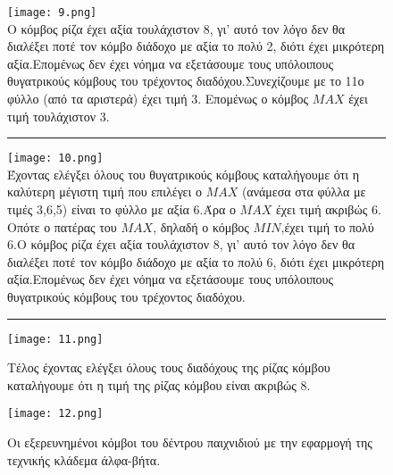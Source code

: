 \documentclass[10pt]{article}
\begin{document}
\begin{figure}[H]    \texttt{[image: 9.png]}\\
    \caption{Ο κόμβος ρίζα έχει αξία τουλάχιστον 8, γι' αυτό τον λόγο δεν θα διαλέξει ποτέ τον κόμβο διάδοχο με αξία το πολύ 2, διότι έχει μικρότερη αξία.Επομένως δεν έχει νόημα να εξετάσουμε τους υπόλοιπους θυγατρικούς κόμβους του τρέχοντος διαδόχου.Συνεχίζουμε με το 11ο φύλλο (από τα αριστερά) έχει τιμή 3. Επομένως ο κόμβος $MAX$ έχει τιμή τουλάχιστον 3.}

     \begin{center}
        \rule{120mm}{0.2mm}
    \end{center}
    \texttt{[image: 10.png]}\\
    \caption{Έχοντας ελέγξει όλους του θυγατρικούς κόμβους καταλήγουμε ότι η καλύτερη μέγιστη τιμή που επιλέγει ο $MAX$ (ανάμεσα στα φύλλα με τιμές 3,6,5) είναι το φύλλο με αξία 6.Άρα ο $MAX$ έχει τιμή ακριβώς 6. Οπότε ο πατέρας του $MAX$, δηλαδή ο κόμβος $MIN$,έχει τιμή το πολύ 6.Ο κόμβος ρίζα έχει αξία τουλάχιστον 8, γι' αυτό τον λόγο δεν θα διαλέξει ποτέ τον κόμβο διάδοχο με αξία το πολύ 6, διότι έχει μικρότερη αξία.Επομένως δεν έχει νόημα να εξετάσουμε τους υπόλοιπους θυγατρικούς κόμβους του τρέχοντος διαδόχου.}
   
    \begin{center}
        \rule{120mm}{0.2mm}
    \end{center}

    \texttt{[image: 11.png]}\\
    \caption{Τέλος έχοντας ελέγξει όλους τους διαδόχους της ρίζας κόμβου καταλήγουμε ότι η τιμή της ρίζας κόμβου είναι ακριβώς 8.}
    
\end{figure}
\begin{figure}
    \texttt{[image: 12.png]}\\
    \caption{Οι εξερευνημένοι κόμβοι του δέντρου παιχνιδιού με την εφαρμογή της τεχνικής κλάδεμα άλφα-βήτα.}
    \vspace{10mm}
\end{figure} 
\end{document}
